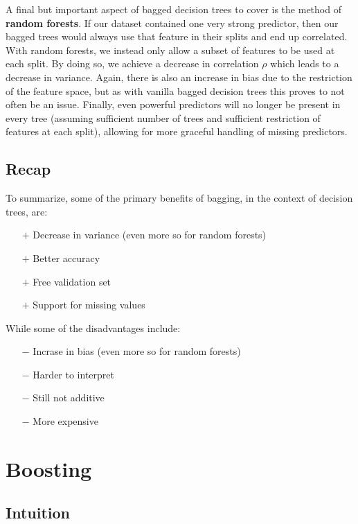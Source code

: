 \documentclass{article}
\begin{document}
A final but important aspect of bagged decision trees to cover is the method of {\bf random forests}.  If our dataset contained one very strong predictor, then our bagged trees would always use that feature in their splits and end up correlated.  With random forests, we instead only allow a subset of features to be used at each split.  By doing so, we achieve a decrease in correlation $\rho$ which leads to a decrease in variance.  Again, there is also an increase in bias due to the restriction of the feature space, but as with vanilla bagged decision trees this proves to not often be an issue.  Finally, even powerful predictors will no longer be present in every tree (assuming sufficient number of trees and sufficient restriction of features at each split), allowing for more graceful handling of missing predictors.

\subsection{Recap}

To summarize, some of the primary benefits of bagging, in the context of decision trees, are:

\begin{itemize}
	\item[$+$] Decrease in variance (even more so for random forests)
	\item[$+$] Better accuracy
	\item[$+$] Free validation set
	\item[$+$] Support for missing values
\end{itemize}

While some of the disadvantages include:

\begin{itemize}
	\item[$-$] Incrase in bias (even more so for random forests)
	\item[$-$] Harder to interpret
	\item[$-$] Still not additive
	\item[$-$] More expensive
\end{itemize}


\section{Boosting}

\subsection{Intuition}
\end{document}
